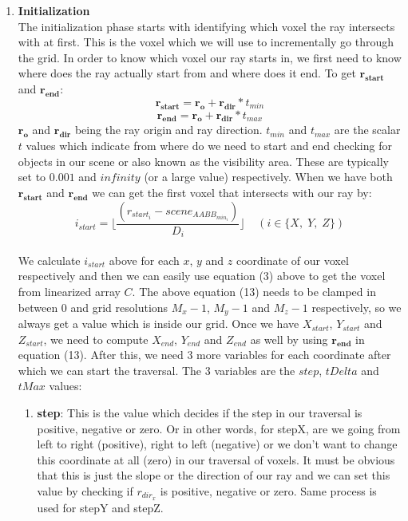 \documentclass[11pt,a4paper]{article}
\begin{document}
\begin{enumerate}
\item \textbf{Initialization}
\\ The initialization phase starts with identifying which voxel the ray intersects with at first. This is the voxel which we will use to incrementally go through the grid. In order to know which voxel our ray starts in, we first need to know where does the ray actually start from and where does it end. To get $\boldsymbol{r_{start}}$ and $\boldsymbol{r_{end}}$:
\begin{equation}
\boldsymbol{r_{start}} = \boldsymbol{r_{o}} + \boldsymbol{r_{dir}} * t_{min}
\end{equation}
\begin{equation}
\boldsymbol{r_{end}} = \boldsymbol{r_{o}} + \boldsymbol{r_{dir}} * t_{max}
\end{equation}
$\boldsymbol{r_{o}}$ and $\boldsymbol{r_{dir}}$ being the ray origin and ray direction. $t_{min}$ and $t_{max}$ are the scalar $t$ values which indicate from where do we need to start and end checking for objects in our scene or also known as the visibility area. These are typically set to $0.001$ and $infinity$ (or a large value) respectively. When we have both $\boldsymbol{r_{start}}$ and $\boldsymbol{r_{end}}$ we can get the first voxel that intersects with our ray by:
 \begin{equation}
i_{start} = \lfloor \frac{(r_{start_{i}} - scene_{AABB_{min_{i}}})}{D_{i}} \rfloor \;\;\;\; (i \in \{X,\;Y,\;Z\})
\end{equation}
\\
We calculate $i_{start}$ above for each $x$, $y$ and $z$ coordinate of our voxel respectively and then we can easily use equation (3) above to get the voxel from linearized array $C$. The above equation (13) needs to be clamped in between $0$ and grid resolutions $M_{x} - 1$, $M_{y} - 1$ and $M_{z} - 1$ respectively, so we always get a value which is inside our grid. Once we have $X_{start}$, $Y_{start}$ and $Z_{start}$, we need to compute $X_{end}$, $Y_{end}$ and $Z_{end}$ as well by using $\boldsymbol{r_{end}}$ in equation (13). After this, we need 3 more variables for each coordinate after which we can start the traversal. The 3 variables are the $step$, $tDelta$ and $tMax$ values:
\begin{enumerate}
\item \textbf{step}: This is the value which decides if the step in our traversal is positive, negative or zero. Or in other words, for stepX, are we going from left to right (positive), right to left (negative) or we don't want to change this coordinate at all (zero) in our traversal of voxels. It must be obvious that this is just the slope or the direction of our ray and we can set this value by checking if $r_{dir_{x}}$ is positive, negative or zero. Same process is used for stepY and stepZ.

\end{enumerate}
\end{enumerate}
\end{document}
